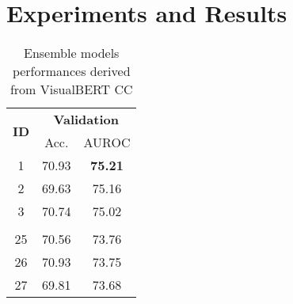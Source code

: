 \documentclass{article}
\begin{document}
\section{Experiments and Results}
\label{experiments}
\begin{table}
  \caption{Ensemble models performances derived from VisualBERT CC}
  \label{table:ensemble}
  \centering
  \begin{tabular}{c|cc}
  \toprule
\multirow{2}{*}{\textbf{ID}}    & \multicolumn{2}{c}{\textbf{Validation}} \\
                                & Acc.             & AUROC  \\
\midrule
1                               & 70.93            & \textbf{75.21 } \\                
2                               & 69.63            & 75.16         \\                  
3                               & 70.74            & 75.02         \\                  
                             &               &            \\
25                              & 70.56            & 73.76         \\
26                              & 70.93            & 73.75         \\
27                              & 69.81            & 73.68         \\
\bottomrule
\end{tabular}
\end{table}
\end{document}
